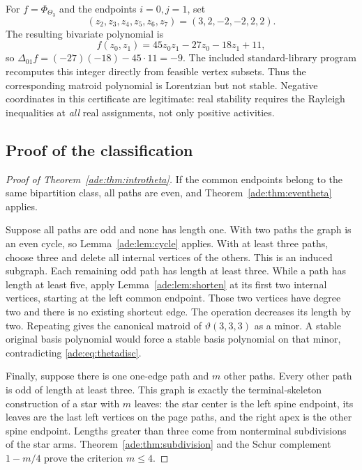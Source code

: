 \documentclass[11pt]{article}
\numberwithin{equation}{section}
\theoremstyle{definition}
\begin{document}
For $f=\Phi_{\Theta_3}$ and the endpoints $i=0,j=1$, set
\begin{equation}
 (z_2,z_3,z_4,z_5,z_6,z_7)=(3,2,-2,-2,2,2).
\label{ade:mat:eq:ray-assignment}
\end{equation}
The resulting bivariate polynomial is
\[
 f(z_0,z_1)=45z_0z_1-27z_0-18z_1+11,
\]
so $\Delta_{01}f=(-27)(-18)-45\cdot11=-9$.
The included standard-library
program recomputes this integer directly from feasible vertex subsets.
Thus the corresponding matroid polynomial is Lorentzian but not stable.
Negative coordinates in this certificate are legitimate: real stability
requires the Rayleigh inequalities at \emph{all} real assignments, not only
positive activities.

\subsection{Proof of the classification}

\begin{proof}[Proof of Theorem~\ref{ade:thm:introtheta}]
If the common endpoints belong to the same bipartition class, all paths
are even, and Theorem~\ref{ade:thm:eventheta} applies.

Suppose all paths are odd and none has length one.  With two paths the
graph is an even cycle, so Lemma~\ref{ade:lem:cycle} applies.
With at least three paths, choose three and delete all internal vertices
of the others.  This is an induced subgraph.  Each remaining odd path
has length at least three.  While a path has length at least five, apply
Lemma~\ref{ade:lem:shorten} at its first two internal vertices, starting at
the left common endpoint.  Those two vertices have degree two and there
is no existing shortcut edge.  The operation decreases its length by
two.  Repeating gives the canonical matroid of $\vartheta(3,3,3)$ as a
minor.  A stable original basis polynomial would force a stable basis
polynomial on that minor, contradicting \eqref{ade:eq:thetadisc}.

Finally, suppose there is one one-edge path and $m$ other paths.
Every other path is odd of length at least three.  This graph is exactly
the terminal-skeleton construction of a star with $m$ leaves: the star
center is the left spine endpoint, its leaves are the last left vertices
on the page paths, and the right apex is the other spine endpoint.
Lengths greater than three come from nonterminal subdivisions of the
star arms.  Theorem~\ref{ade:thm:subdivision} and the Schur complement
$1-m/4$ prove the criterion $m\le4$.
\end{proof}
\end{document}
